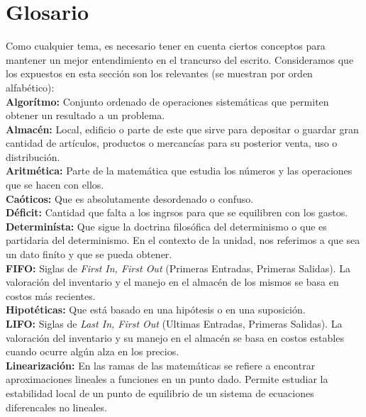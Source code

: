 \documentclass[letterpaper, 12pt]{article}
\begin{document}
    \newpage
    \section*{Glosario}
    \justify    
    Como cualquier tema, es necesario tener en cuenta ciertos conceptos para mantener un mejor entendimiento en el trancurso del escrito. Consideramos que los expuestos en esta sección son los relevantes (se muestran por orden alfabético):
    \\\newline
    \textbf{Algorítmo:} Conjunto ordenado de operaciones sistemáticas que permiten obtener un resultado a un problema.
    \\
    \textbf{Almacén:} Local, edificio o parte de este que sirve para depositar o guardar gran cantidad de artículos, productos o mercancías para su posterior venta, uso o distribución.
    \\
    \textbf{Aritmética:} Parte de la matemática que estudia los números y las operaciones que se hacen con ellos.
    \\
    \textbf{Caóticos:} Que es absolutamente desordenado o confuso.
    \\
    \textbf{Déficit:} Cantidad que falta a los ingrsos para que se equilibren con los gastos.
    \\
    \textbf{Determinísta:} Que sigue la doctrina filosófica del determinismo o que es partidaria del determinismo. En el contexto de la unidad, nos referimos a que sea un dato finíto y que se pueda obtener.
    \\
    \textbf{FIFO:} Siglas de \emph{First In, First Out} (Primeras Entradas, Primeras Salidas). La valoración del inventario y el manejo en el almacén de los mismos se basa en costos más recientes.
    \\
    \textbf{Hipotéticas:} Que está basado en una hipótesis o en una suposición.
    \\
    \textbf{LIFO:} Siglas de \emph{Last In, First Out} (Ultimas Entradas, Primeras Salidas). La valoración del inventario y su manejo en el almacén se basa en costos estables cuando ocurre algún alza en los precios.
    \\
    \textbf{Linearización:} En las ramas de las matemáticas se refiere a encontrar aproximaciones lineales a funciones en un punto dado. Permite estudiar la estabilidad local de un punto de equilibrio de un sistema de ecuaciones diferencales no lineales.
     
\end{document}
